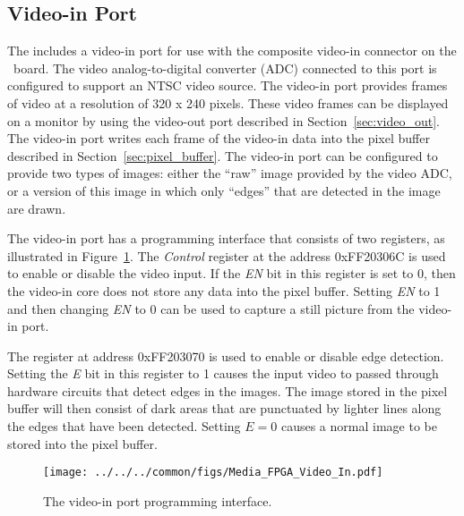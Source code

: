 \subsection{Video-in Port}
\label{sec:video_in}

The {\it \systemNameFull} includes a video-in port for use with the composite video-in
connector on the \DEBoard~board. The video analog-to-digital converter (ADC) connected to this
port is configured to support an NTSC video source. The video-in port provides frames of video 
at a resolution of 320 {\sf x} 240 pixels.  These video frames can be displayed on a 
monitor by using the video-out port described in Section~\ref{sec:video_out}.  The video-in 
port writes each frame of the video-in data into the pixel buffer described in 
Section~\ref{sec:pixel_buffer}. The video-in port can be configured to provide two types
of images: either the ``raw'' image provided by the video ADC, or a version of this image
in which only ``edges'' that are detected in the image are drawn.

The video-in port has a programming interface that consists of two registers, as
illustrated in Figure~\ref{fig:video_in}. The {\it Control} register at the address
{\sf 0xFF20306C} is used to enable or disable the video input. If the {\it EN} bit in this
register is set to 0, then the video-in core does not store any data into the pixel
buffer. Setting {\it EN} to 1 and then changing {\it EN} to 0 can be used to capture a 
still picture from the video-in port.

The register at address {\sf 0xFF203070} is used to enable or disable edge detection.
Setting the {\it E} bit in this register to 1 causes the input video to passed through
hardware circuits that detect edges in the images. The image stored in the pixel buffer
will then consist of dark areas that are punctuated by lighter lines along the edges that
have been detected.  Setting $E=0$ causes a normal image to be stored into the pixel
buffer.

\begin{figure}[h!]
   \begin{center}
       \texttt{[image: ../../../common/figs/Media\_FPGA\_Video\_In.pdf]}
   \end{center}
   \caption{The video-in port programming interface.}
	\label{fig:video_in}
\end{figure}


